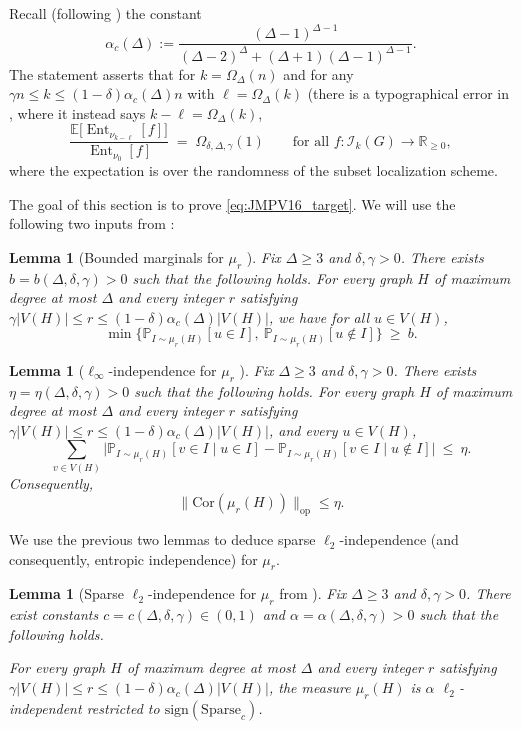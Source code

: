 \documentclass[11pt,reqno,letterpaper]{amsart}
\renewcommand{\P}{\mathbb{P}}
\newcommand{\R}{\mathbb{R}}
\newcommand{\cI}{\mathcal{I}}
\numberwithin{equation}{section}
\newtheorem{lemma}[theorem]{Lemma}
\theoremstyle{definition}
\DeclareMathOperator{\Ent}{Ent}
\newcommand{\E}{\mathbb{E}}
\begin{document}
Recall (following \cite{JMPV}) the constant
\[
\alpha_c(\Delta)
:= \frac{(\Delta-1)^{\Delta-1}}{(\Delta-2)^{\Delta} + (\Delta+1)(\Delta-1)^{\Delta-1}}.
\]
The statement \cite[Eq.~(16)]{JMPV} asserts that for $k=\Omega_\Delta(n)$ and for any $\gamma n \leq k \leq (1-\delta)\alpha_c(\Delta)n$ with
$\ell=\Omega_\Delta(k)$ (there is a typographical error in \cite{JMPV}, where it instead says $k-\ell = \Omega_{\Delta}(k)$,
\begin{equation}
\label{eq:JMPV16_target}
\frac{\E\big[\Ent_{\nu_{k-\ell}}[f]\big]}{\Ent_{\nu_0}[f]}
\;=\;\Omega_{\delta,\Delta, \gamma}(1)
\qquad\text{for all }f:\cI_k(G)\to\R_{\ge 0},
\end{equation}
where the expectation is over the randomness of the subset localization scheme.

The goal of this section is to prove \cref{eq:JMPV16_target}. We will use the following two inputs from \cite{JMPV}:


\begin{lemma}[Bounded marginals for $\mu_r$ {\cite[Lemma~21]{JMPV}}]
\label{lem:JMPV_marginals}
Fix $\Delta\ge 3$ and $\delta,\gamma>0$. There exists $b=b(\Delta,\delta,\gamma)>0$ such that the following
holds.
For every graph $H$ of maximum degree at most $\Delta$ and every integer $r$ satisfying
$\gamma|V(H)|\le r \le (1-\delta)\alpha_c(\Delta)|V(H)|$, we have for all $u\in V(H)$,
\[
\min\{\P_{I\sim \mu_r(H)}[u\in I],\ \P_{I\sim \mu_r(H)}[u\notin I]\}\ \ge\ b.
\]
\end{lemma}

\begin{lemma}[$\ell_\infty$-independence for $\mu_r$ {\cite[Theorem~8]{JMPV}}]
\label{lem:JMPV_linf_indep}
Fix $\Delta\ge 3$ and $\delta,\gamma>0$. There exists $\eta=\eta(\Delta,\delta,\gamma)>0$ such that the
following holds.
For every graph $H$ of maximum degree at most $\Delta$ and every integer $r$ satisfying
$\gamma|V(H)|\le r \le (1-\delta)\alpha_c(\Delta)|V(H)|$, and every $u\in V(H)$,
\[
\sum_{v\in V(H)}
\big|\P_{I\sim \mu_r(H)}[v\in I\mid u\in I]-\P_{I\sim \mu_r(H)}[v\in I\mid u\notin I]\big|
\ \le\ \eta.
\]
Consequently,
\[\|\mathrm{Cor}(\mu_r(H)) \|_{\mathrm{op}} \leq \eta.\]
\end{lemma}

We use the previous two lemmas to deduce sparse $\ell_2$-independence (and consequently, entropic independence) for $\mu_r$.

\begin{lemma}[Sparse $\ell_2$-independence for $\mu_r$ from \cite{JMPV}]
\label{lem:sparse_l2_indep_muk}
Fix $\Delta\ge 3$ and $\delta,\gamma>0$. There exist constants
$c=c(\Delta,\delta,\gamma)\in(0,1)$ and $\alpha=\alpha(\Delta,\delta,\gamma)>0$ such that the following holds.

For every graph $H$ of maximum degree at most $\Delta$ and every integer $r$ satisfying
$\gamma|V(H)|\le r \le (1-\delta)\alpha_c(\Delta)|V(H)|$, the measure $\mu_r(H)$ is $\alpha$ $\ell_2$-independent restricted to $\mathrm{sign}(\mathrm{Sparse}_c)$.
\end{lemma}
\end{document}
